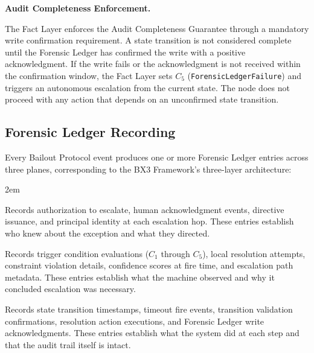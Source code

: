 \bigskip

\noindent\textbf{Audit Completeness Enforcement.}

The Fact Layer enforces the Audit Completeness Guarantee through a mandatory write
confirmation requirement. A state transition is not considered complete until the
Forensic Ledger has confirmed the write with a positive acknowledgment. If the write
fails or the acknowledgment is not received within the confirmation window, the Fact
Layer sets $C_5$ (\texttt{ForensicLedgerFailure}) and triggers an autonomous escalation
from the current state. The node does not proceed with any action that depends on an
unconfirmed state transition.


\subsection{Forensic Ledger Recording}
\label{sec:forensic-ledger}

Every Bailout Protocol event produces one or more Forensic Ledger entries across three
planes, corresponding to the BX3 Framework's three-layer architecture:

\bigskip

\begin{trivlist}\itemindent2em
\item[\textbf{Purpose Plane}] Records authorization to escalate, human acknowledgment
  events, directive issuance, and principal identity at each escalation hop. These
  entries establish who knew about the exception and what they directed.

\item[\textbf{Bounds Engine Plane}] Records trigger condition evaluations ($C_1$ through
  $C_5$), local resolution attempts, constraint violation details, confidence scores
  at fire time, and escalation path metadata. These entries establish what the machine
  observed and why it concluded escalation was necessary.

\item[\textbf{Fact Plane}] Records state transition timestamps, timeout fire events,
  transition validation confirmations, resolution action executions, and Forensic
  Ledger write acknowledgments. These entries establish what the system did at each
  step and that the audit trail itself is intact.
\end{trivlist}

